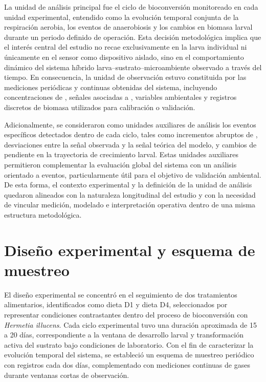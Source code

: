 La unidad de análisis principal fue el ciclo de bioconversión monitoreado en cada unidad experimental, entendido como la evolución temporal conjunta de la respiración aerobia, los eventos de anaerobiosis y los cambios en biomasa larval durante un periodo definido de operación. Esta decisión metodológica implica que el interés central del estudio no recae exclusivamente en la larva individual ni únicamente en el sensor como dispositivo aislado, sino en el comportamiento dinámico del sistema híbrido larva--sustrato--microambiente observado a través del tiempo. En consecuencia, la unidad de observación estuvo constituida por las mediciones periódicas y continuas obtenidas del sistema, incluyendo concentraciones de , señales asociadas a , variables ambientales y registros discretos de biomasa utilizados para calibración o validación.

Adicionalmente, se consideraron como unidades auxiliares de análisis los eventos específicos detectados dentro de cada ciclo, tales como incrementos abruptos de , desviaciones entre la señal observada y la señal teórica del modelo, y cambios de pendiente en la trayectoria de crecimiento larval. Estas unidades auxiliares permitieron complementar la evaluación global del sistema con un análisis orientado a eventos, particularmente útil para el objetivo de validación ambiental. De esta forma, el contexto experimental y la definición de la unidad de análisis quedaron alineados con la naturaleza longitudinal del estudio y con la necesidad de vincular medición, modelado e interpretación operativa dentro de una misma estructura metodológica.

\section{Diseño experimental y esquema de muestreo}

El diseño experimental se concentró en el seguimiento de dos tratamientos alimentarios, identificados como dieta D1 y dieta D4, seleccionados por representar condiciones contrastantes dentro del proceso de bioconversión con \textit{Hermetia illucens}. Cada ciclo experimental tuvo una duración aproximada de 15 a 20 días, correspondiente a la ventana de desarrollo larval y transformación activa del sustrato bajo condiciones de laboratorio. Con el fin de caracterizar la evolución temporal del sistema, se estableció un esquema de muestreo periódico con registros cada dos días, complementado con mediciones continuas de gases durante ventanas cortas de observación.

